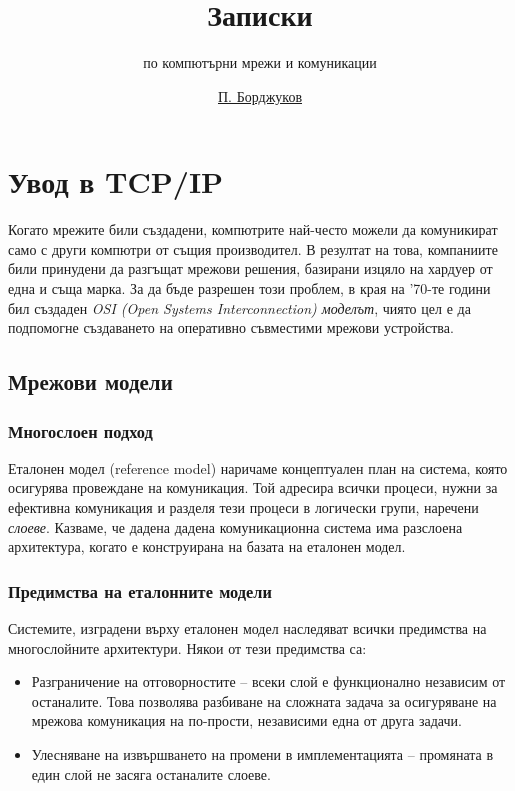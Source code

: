 \documentclass{scrartcl}
\begin{document}
\title{Записки}
\subtitle{по компютърни мрежи и комуникации}
\author{\href{mailto:bordjukov@gmail.com}{П. Борджуков}}
\date{}

\maketitle

\section{Увод в TCP/IP}
Когато мрежите били създадени, компютрите най-често можели да комуникират само с
други компютри от същия производител. В резултат на това, компаниите били
принудени да разгъщат мрежови решения, базирани изцяло на хардуер от една и съща
марка. За да бъде разрешен този проблем, в края на '70-те години бил създаден
\emph{OSI (Open Systems Interconnection) моделът}, чиято цел е да подпомогне
създаването на оперативно съвместими мрежови устройства.

\subsection{Мрежови модели}

\subsubsection{Многослоен подход}
Еталонен модел (reference model) наричаме концептуален план на система, която
осигурява провеждане на комуникация. Той адресира всички процеси, нужни за
ефективна комуникация и разделя тези процеси в логически групи, наречени
\emph{слоеве}. Казваме, че дадена дадена комуникационна система има разслоена
архитектура, когато е конструирана на базата на еталонен модел.

\subsubsection{Предимства на еталонните модели}
Системите, изградени върху еталонен модел наследяват всички предимства на
многослойните архитектури. Някои от тези предимства са:
\begin{itemize}
\item Разграничение на отговорностите – всеки слой е функционално независим от
  останалите. Това позволява разбиване на сложната задача за осигуряване на
  мрежова комуникация на по-прости, независими една от друга задачи.
\item Улесняване на извършването на промени в имплементацията – промяната в един
  слой не засяга останалите слоеве.
\end{itemize}
\end{document}
